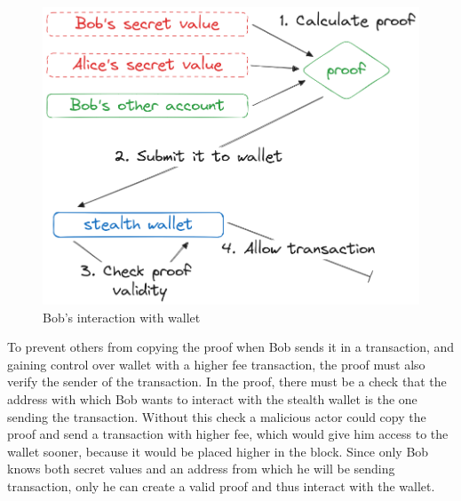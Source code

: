 \documentclass[conference,comsoc,10pt]{IEEEtran}
\begin{document}
    \begin{figure}[h]
        \centering
        \includegraphics[scale=0.25]{./assets/images/interating-with-wallet.png}
        \caption{Bob's interaction with wallet}
        \label{fig:wallet-interaction}
    \end{figure}

    To prevent others from copying the proof when Bob sends it in a transaction,
    and gaining control over wallet with a higher fee transaction, the proof
    must also verify the sender of the transaction. In the proof, there must
    be a check that the address with which Bob wants to interact with the
    stealth wallet is the one sending the transaction. Without this check a malicious
    actor could copy the proof and send a transaction with higher fee, which would
    give him access to the wallet sooner, because it would be placed higher in
    the block. Since only Bob knows both secret values and an address from which
    he will be sending transaction, only he can create a valid proof and thus
    interact with the wallet.
\end{document}
